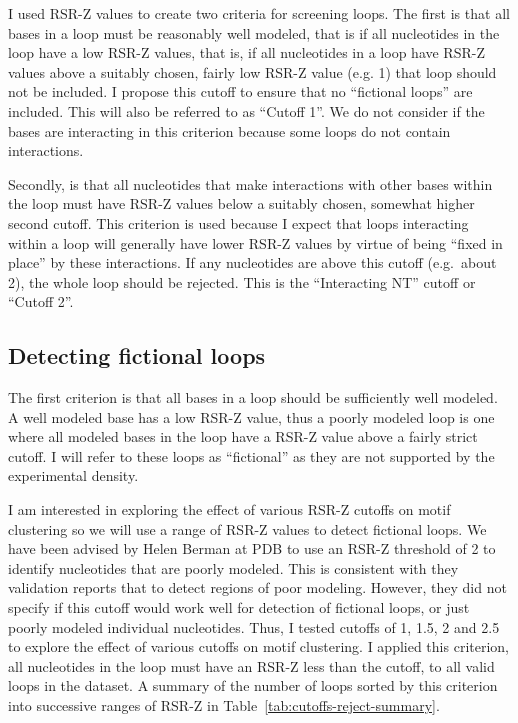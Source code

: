 I used RSR-Z values to create two criteria for screening loops. The first is
that all bases in a loop must be reasonably well modeled, that is if all
nucleotides in the loop have a low RSR-Z values, that is, if all nucleotides in
a loop have RSR-Z values above a suitably chosen, fairly low RSR-Z value (e.g.
1) that loop should not be included. I propose this cutoff to ensure that no
``fictional loops'' are included. This will also be referred to as ``Cutoff 1''.
We do not consider if the bases are interacting in this criterion because some
loops do not contain interactions. 

Secondly, is that all nucleotides that make interactions with other bases within
the loop must have RSR-Z values below a suitably chosen, somewhat higher second
cutoff. This criterion is used because I expect that loops interacting within a
loop will generally have lower RSR-Z values by virtue of being ``fixed in place''
by these interactions. If any nucleotides are above this cutoff (e.g.\ about 2),
the whole loop should be rejected. This is the ``Interacting NT'' cutoff or
``Cutoff 2''.

\subsection{Detecting fictional loops}

The first criterion is that all bases in a loop should be sufficiently well
modeled. A well modeled base has a low RSR-Z value, thus a poorly modeled loop is
one where all modeled bases in the loop have a RSR-Z value above a fairly strict
cutoff. I will refer to these loops as ``fictional'' as they are not supported
by the experimental density. 

I am interested in exploring the effect of various RSR-Z cutoffs on motif
clustering so we will use a range of RSR-Z values to detect fictional loops. We
have been advised by Helen Berman at PDB to use an RSR-Z threshold of 2 to
identify nucleotides that are poorly modeled. This is consistent with they
validation reports that to detect regions of poor modeling. However, they did
not specify if this cutoff would work well for detection of fictional loops, or
just poorly modeled individual nucleotides. Thus, I tested cutoffs of 1, 1.5, 2 and
2.5 to explore the effect of various cutoffs on motif clustering. I applied this
criterion, all nucleotides in the loop must have an RSR-Z less than the cutoff,
to all valid loops in the dataset. A summary of the number of loops sorted by
this criterion into successive ranges of RSR-Z in
Table~\ref{tab:cutoffs-reject-summary}.

